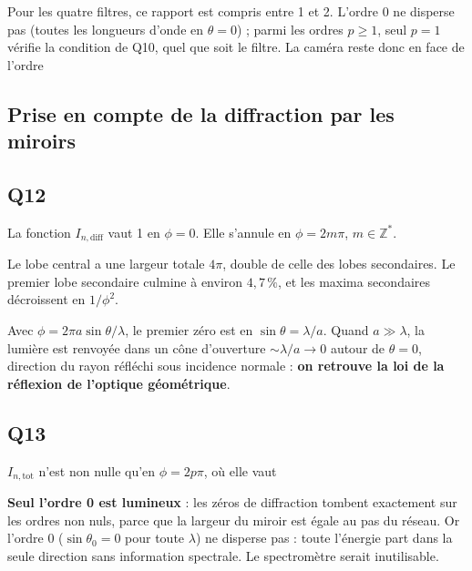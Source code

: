 \documentclass[11pt,a4paper]{article}
\newcommand{\equationajustee}[1]{%
  \sbox{\boiteequation}{$\displaystyle #1$}%
  \ifdim\wd\boiteequation>\linewidth
    \[\resizebox{\linewidth}{!}{\usebox{\boiteequation}}\]%
  \else
    \[#1\]%
  \fi}
\begin{document}
Pour les quatre filtres, ce rapport est compris entre 1 et 2. L'ordre 0 ne disperse pas (toutes les longueurs d'onde en \(\theta = 0\)) ; parmi les ordres \(p\ge1\), seul \(p = 1\) vérifie la condition de Q10, quel que soit le filtre. La caméra reste donc en face de l'ordre

\equationajustee{\boxed{p_0 = 1}}

\hypertarget{prise-en-compte-de-la-diffraction-par-les-miroirs}{%
\subsection{Prise en compte de la diffraction par les miroirs}\label{prise-en-compte-de-la-diffraction-par-les-miroirs}}

\hypertarget{q12}{%
\subsection{Q12}\label{q12}}

La fonction \(I_{n,\text{diff}}\) vaut 1 en \(\phi = 0\). Elle s'annule en \(\phi = 2m\pi\), \(m\in\mathbb Z^*\).

Le lobe central a une largeur totale \(4\pi\), double de celle des lobes secondaires. Le premier lobe secondaire culmine à environ \(4{,}7\,\%\), et les maxima secondaires décroissent en \(1/\phi^2\).

Avec \(\phi = 2\pi a\sin\theta/\lambda\), le premier zéro est en \(\sin\theta = \lambda/a\). Quand \(a\gg\lambda\), la lumière est renvoyée dans un cône d'ouverture \(\sim\lambda/a\to0\) autour de \(\theta = 0\), direction du rayon réfléchi sous incidence normale : \textbf{on retrouve la loi de la réflexion de l'optique géométrique}.

\hypertarget{q13}{%
\subsection{Q13}\label{q13}}

\(I_{n,\text{tot}}\) n'est non nulle qu'en \(\phi = 2p\pi\), où elle vaut

\equationajustee{I_{n,\text{diff}}(2p\pi) = \left(\frac{\sin p\pi}{p\pi}\right)^2 = \begin{cases}1 & p = 0\\ 0 & p\neq0\end{cases}}

\textbf{Seul l'ordre 0 est lumineux} : les zéros de diffraction tombent exactement sur les ordres non nuls, parce que la largeur du miroir est égale au pas du réseau. Or l'ordre 0 (\(\sin\theta_0 = 0\) pour toute \(\lambda\)) ne disperse pas : toute l'énergie part dans la seule direction sans information spectrale. Le spectromètre serait inutilisable.
\end{document}
